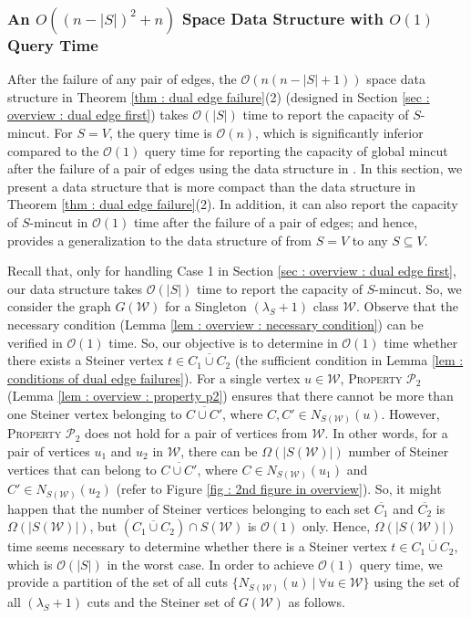 \documentclass[letterpaper,11pt]{article}
\begin{document}
\subsubsection{An $O((n-|S|)^2+n)$ Space Data Structure with $O(1)$ Query Time}
 After the failure of any pair of edges, the ${\mathcal O}(n(n-|S|+1))$ space data structure in Theorem \ref{thm : dual edge failure}(2) (designed in Section \ref{sec : overview : dual edge first}) takes ${\mathcal O}(|S|)$ time to report the capacity of $S$-mincut. For $S=V$, the query time is ${\mathcal O}(n)$, which is significantly inferior compared to the ${\mathcal O}(1)$ query time for reporting the capacity of global mincut after the failure of a pair of edges using the data structure in \cite{DBLP:conf/stoc/DinitzN95}. In this section, we present a data structure that is more compact than the data structure in Theorem \ref{thm : dual edge failure}(2). In addition, it can also report the capacity of $S$-mincut in ${\mathcal O}(1)$ time after the failure of a pair of edges; and hence, provides a generalization to the data structure of \cite{DBLP:conf/stoc/DinitzN95} from $S=V$ to any $S\subseteq V$. 




Recall that, only for handling Case 1 in Section \ref{sec : overview : dual edge first}, our data structure takes ${\mathcal O}(|S|)$ time to report the capacity of $S$-mincut. So, we consider the graph $G({\mathcal W})$ for a Singleton $(\lambda_S+1)$ class ${\mathcal W}$.  
Observe that the necessary condition (Lemma \ref{lem : overview : necessary condition}) can be verified in ${\mathcal O}(1)$ time. So, our objective is to determine in ${\mathcal O}(1)$ time whether there exists a Steiner vertex $t\in \overline{C_1\cup C_2}$ (the sufficient condition in Lemma \ref{lem : conditions of dual edge failures}).
For a single vertex $u\in {\mathcal W}$, \textsc{Property ${\mathcal P}_2$} (Lemma \ref{lem : overview : property p2}) ensures that there cannot be more than one Steiner vertex belonging to $\overline{C\cup C'}$, where $C,C'\in N_{S({\mathcal W})}(u)$. However, \textsc{Property ${\mathcal P}_2$} does not hold for a pair of vertices from ${\mathcal W}$. In other words, for a pair of vertices $u_1$ and $u_2$ in ${\mathcal W}$, there can be $\Omega(|S({\mathcal W})|)$ number of Steiner vertices that can belong to $\overline{C\cup C'}$, where $C\in N_{S({\mathcal W})}(u_1)$ and $C'\in N_{S({\mathcal W})}(u_2)$ (refer to Figure \ref{fig : 2nd figure in overview}). 
So, it might happen that the number of Steiner vertices belonging to each set $\overline{C_1}$ and $\overline{C_2}$ is ${\Omega}(|S({\mathcal W})|)$, but $(\overline{C_1\cup C_2})\cap S({\mathcal W})$ is ${\mathcal O}(1)$ only. Hence, $\Omega(|S({\mathcal W})|)$ time seems necessary to determine whether there is a Steiner vertex $t\in \overline{C_1\cup C_2}$, which is ${\mathcal O}(|S|)$ in the worst case.
In order to achieve ${\mathcal O}(1)$ query time, we provide a partition of the set of all cuts $\{N_{S({\mathcal W})}(u) ~|~ \forall u\in {\mathcal W}\}$ using the set of all $(\lambda_S+1)$ cuts and the Steiner set of $G({\mathcal W})$ as follows.
\end{document}

